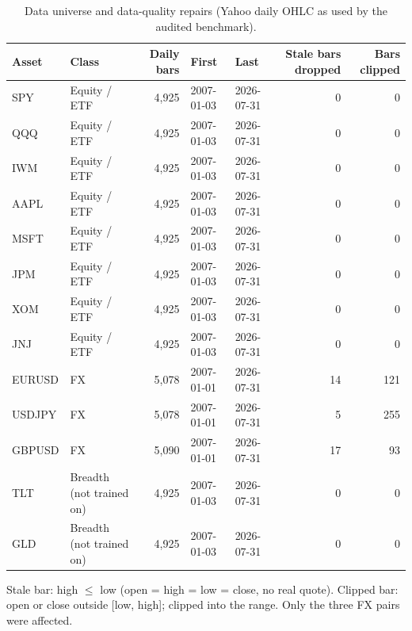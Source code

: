 \begin{table}[!htbp]
\centering
\footnotesize
\caption{Data universe and data-quality repairs (Yahoo daily OHLC as used by the audited benchmark).}
\label{tab:data}
\begin{tabularx}{\linewidth}{llrllrr}
\toprule
\textbf{Asset} & \textbf{Class} & \textbf{Daily bars} & \textbf{First} & \textbf{Last} & \textbf{Stale bars dropped} & \textbf{Bars clipped} \\
\midrule
SPY & Equity / ETF & 4,925 & 2007-01-03 & 2026-07-31 & 0 & 0 \\
QQQ & Equity / ETF & 4,925 & 2007-01-03 & 2026-07-31 & 0 & 0 \\
IWM & Equity / ETF & 4,925 & 2007-01-03 & 2026-07-31 & 0 & 0 \\
AAPL & Equity / ETF & 4,925 & 2007-01-03 & 2026-07-31 & 0 & 0 \\
MSFT & Equity / ETF & 4,925 & 2007-01-03 & 2026-07-31 & 0 & 0 \\
JPM & Equity / ETF & 4,925 & 2007-01-03 & 2026-07-31 & 0 & 0 \\
XOM & Equity / ETF & 4,925 & 2007-01-03 & 2026-07-31 & 0 & 0 \\
JNJ & Equity / ETF & 4,925 & 2007-01-03 & 2026-07-31 & 0 & 0 \\
EURUSD & FX & 5,078 & 2007-01-01 & 2026-07-31 & 14 & 121 \\
USDJPY & FX & 5,078 & 2007-01-01 & 2026-07-31 & 5 & 255 \\
GBPUSD & FX & 5,090 & 2007-01-01 & 2026-07-31 & 17 & 93 \\
TLT & Breadth (not trained on) & 4,925 & 2007-01-03 & 2026-07-31 & 0 & 0 \\
GLD & Breadth (not trained on) & 4,925 & 2007-01-03 & 2026-07-31 & 0 & 0 \\
\bottomrule
\end{tabularx}
\par\smallskip\begin{minipage}{\linewidth}\scriptsize Stale bar: high $\le$ low (open = high = low = close, no real quote). Clipped bar: open or close outside [low, high]; clipped into the range. Only the three FX pairs were affected.\end{minipage}
\end{table}

